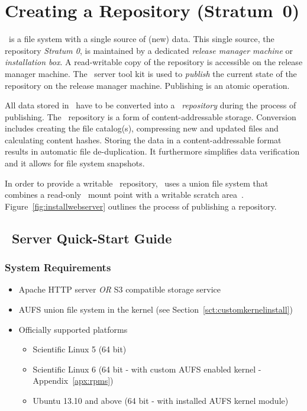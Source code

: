 \chapter{Creating a Repository (Stratum~0)}
\label{sct:createrepo}


\cvmfs\ is a file system with a single source of (new) data.
This single source, the repository \emph{Stratum 0}, is maintained by a dedicated \emph{release manager machine} or \emph{installation box}.
A read-writable copy of the repository is accessible on the release manager machine.
The \cvmfs\ server tool kit is used to \emph{publish} the current state of the repository on the release manager machine.
Publishing is an atomic operation.

All data stored in \cvmfs\ have to be converted into a \cvmfs\ \emph{repository} during the process of publishing.
The \cvmfs\ repository is a form of content-addressable storage.
Conversion includes creating the file catalog(s), compressing new and updated files and calculating content hashes.
Storing the data in a content-addressable format results in automatic file de-duplication.
It furthermore simplifies data verification and it allows for file system snapshots.

In order to provide a writable \cvmfs\ repository, \cvmfs\ uses a union file system that combines a read-only \cvmfs\ mount point with a writable scratch area~\cite{unionfs04,aufs}.
Figure~\ref{fig:installwebserver} outlines the process of publishing a repository.

\pagebreak

\section{\cvmfs\ Server Quick-Start Guide}
\label{sct:quickstart}

\subsection{System Requirements}
\begin{itemize}
\item Apache HTTP server \emph{OR} S3 compatible storage service
\item AUFS union file system in the kernel (see Section~\ref{sct:customkernelinstall})
\item Officially supported platforms
\begin{itemize}
    \item Scientific Linux 5 (64 bit)
    \item Scientific Linux 6 (64 bit - with custom AUFS enabled kernel - Appendix~\ref{apx:rpms})
    \item Ubuntu 13.10 and above (64 bit - with installed AUFS kernel module)
\end{itemize}
\end{itemize}


